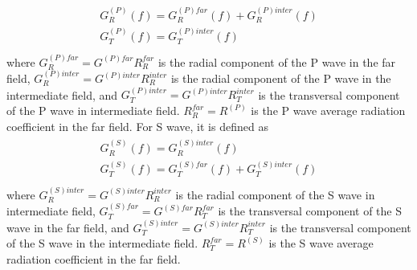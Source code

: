 \documentclass[letterpaper,10pt,english]{sphinxmanual}
\begin{document}
\begin{fulllineitems}
\begin{description}
\end{description}
\begin{align*}\!\begin{aligned}
G_R^{\left(P\right)}\left(f\right)= G_R^{\left(P\right)far}\left(f\right)
+G_R^{\left(P\right)inter}\left(f\right)\\
G_T^{\left(P\right)}\left(f\right) = G_T^{\left(P\right)inter}\left(f\right)\\
\end{aligned}\end{align*}
\sphinxAtStartPar
where \(G_R^{\left(P\right)far} = G^{\left(P\right)far}R_R^{far}\)
is the radial component of the P wave in the far field,
\(G_R^{\left(P\right)inter} = G^{\left(P\right)inter}R_R^{inter}\)
is the radial component of the P wave in the intermediate field,
and \(G_T^{\left(P\right)inter} = G^{\left(P\right)inter}R_T^{inter}\)
is the transversal component of the P wave in intermediate field.
\(R_R^{far}= R^{(P)}\) is the P wave average radiation coefficient in the far field.
For S wave, it is defined as
\begin{align*}\!\begin{aligned}
G_R^{(S)}\left(f\right) = G_R^{\left(S\right)inter}\left(f\right)\\
G_T^{(S)}\left(f\right) = G_T^{\left(S\right)far}\left(f\right)+G_T^{\left(S\right)inter}\left(f\right)\\
\end{aligned}\end{align*}
\sphinxAtStartPar
where \(G_R^{\left(S\right)inter} = G^{\left(S\right)inter}R_R^{inter}\)
is the radial component of the S wave in intermediate field,
\(G_T^{\left(S\right)far} = G^{\left(S\right)far}R_T^{far}\)
is the transversal component of the S wave in the far field,
and \(G_T^{\left(S\right)inter} = G^{\left(S\right)inter}R_T^{inter}\)
is the transversal component of the S wave in the intermediate field.
\(R_T^{far}= R^{(S)}\) is the S wave average radiation coefficient in the far field.


\end{fulllineitems}
\end{document}
